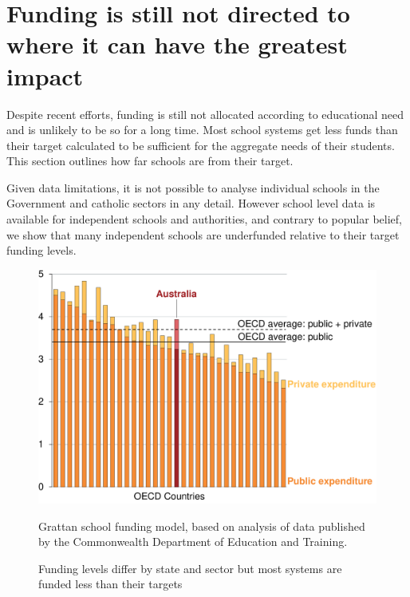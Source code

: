 \documentclass{grattan}
\begin{document}
\section{Funding is still not directed to where it can have the greatest impact}\label{sec:current-situation-funding-is-still-not-directed-to-where-it-can-have-the-greatest-impact}

Despite recent efforts, funding is still not allocated according to educational need and is unlikely to be so for a long time.
Most school systems get less funds than their target calculated to be sufficient for the aggregate needs of their students. This section outlines how far schools are from their target.

Given data limitations, it is not possible to analyse individual schools in the Government and catholic sectors in any detail. However school level data is available for independent schools and authorities, and contrary to popular belief, we show that many independent schools are underfunded relative to their target funding levels.


\begin{figure}[!p]
\caption{Funding levels differ by state and sector but most systems are funded less than their targets}\label{fig:funding-levels-differ-by-state-and-sector}

\includegraphics[page=2]{atlas/Charts.pdf}

%
{Grattan school funding model, based on analysis of data published by the Commonwealth Department of Education and Training.}
\end{figure}
\end{document}
